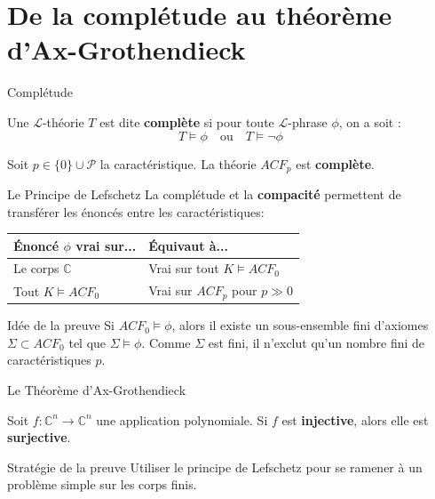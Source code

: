 \documentclass{beamer}
\begin{document}
  \section{De la complétude au théorème d'Ax-Grothendieck}
\begin{frame}{Complétude}
    \begin{definition}
        Une $\mathcal{L}$-théorie $T$ est dite \textbf{complète} si pour toute $\mathcal{L}$-phrase $\phi$, on a soit :
        \[ T \models \phi \quad \text{ou} \quad T \models \neg\phi \]
    \end{definition}
    
    \pause
    \begin{theorem}
        Soit $p \in \{0\} \cup \mathcal{P}$ la caractéristique. La théorie $ACF_p$ est \textbf{complète}.
    \end{theorem}
\end{frame}


\begin{frame}{Le Principe de Lefschetz}
    La complétude et la \textbf{compacité} permettent de transférer les énoncés entre les caractéristiques:
    
    \begin{table}
        \centering
        \begin{tabular}{ll}
            \toprule
            \textbf{Énoncé $\phi$ vrai sur...} & \textbf{Équivaut à...} \\
            \midrule
            Le corps $\mathbb{C}$ & Vrai sur tout $K \models ACF_0$ \\
            Tout $K \models ACF_0$ & Vrai sur $ACF_p$ pour $p \gg 0$ \\
            \bottomrule
        \end{tabular}
    \end{table}

    \pause
    \begin{exampleblock}{Idée de la preuve}
        Si $ACF_0 \models \phi$, alors il existe un sous-ensemble fini d'axiomes $\Sigma \subset ACF_0$ tel que $\Sigma \models \phi$. Comme $\Sigma$ est fini, il n'exclut qu'un nombre fini de caractéristiques $p$.
    \end{exampleblock}
\end{frame}

\begin{frame}{Le Théorème d'Ax-Grothendieck}
    \begin{theorem}[Ax-Grothendieck, 1966]
        Soit $f : \mathbb{C}^n \to \mathbb{C}^n$ une application polynomiale. 
        Si $f$ est \textbf{injective}, alors elle est \textbf{surjective}.
    \end{theorem}

    \pause
    
    \begin{exampleblock}{Stratégie de la preuve}
        Utiliser le principe de Lefschetz pour se ramener à un problème simple sur les corps finis.
    \end{exampleblock}
\end{frame}
\end{document}
